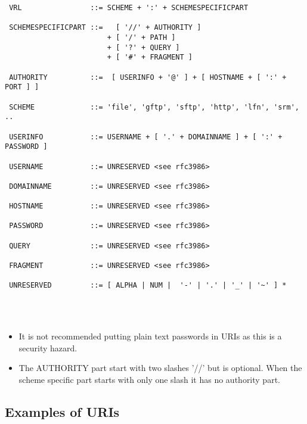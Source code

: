 \hspace*{10mm}\begin{minipage}{170mm}
\begin{verbatim}
 VRL                ::= SCHEME + ':' + SCHEMESPECIFICPART

 SCHEMESPECIFICPART ::=   [ '//' + AUTHORITY ]  
                        + [ '/' + PATH ] 
                        + [ '?' + QUERY ] 
                        + [ '#' + FRAGMENT ]

 AUTHORITY          ::=  [ USERINFO + '@' ] + [ HOSTNAME + [ ':' + PORT ] ]  

 SCHEME             ::= 'file', 'gftp', 'sftp', 'http', 'lfn', 'srm', ..

 USERINFO           ::= USERNAME + [ '.' + DOMAINNAME ] + [ ':' + PASSWORD ]

 USERNAME           ::= UNRESERVED <see rfc3986> 

 DOMAINNAME         ::= UNRESERVED <see rfc3986>

 HOSTNAME           ::= UNRESERVED <see rfc3986> 

 PASSWORD           ::= UNRESERVED <see rfc3986>

 QUERY              ::= UNRESERVED <see rfc3986>
	
 FRAGMENT           ::= UNRESERVED <see rfc3986>

 UNRESERVED         ::= [ ALPHA | NUM |  '-' | '.' | '_' | '~' ] * 

\end{verbatim}
\end{minipage}\\
\\
\begin{itemize}
  \item It is not recommended putting plain text passwords in URIs as this 
        is a security hazard. 
  \item The AUTHORITY part start with two slashes '//' but is optional. When
        the scheme specific part starts with only one slash it has no authority
        part.
\end{itemize}

\subsection{Examples of URIs}

